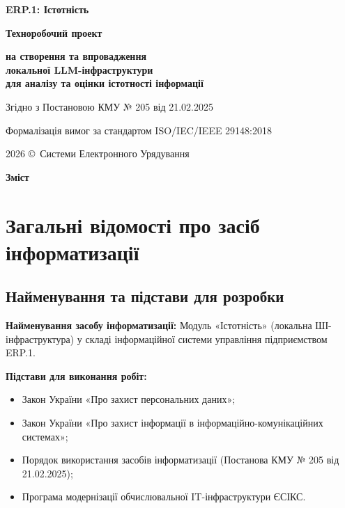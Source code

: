 \documentclass{article}
\newcommand\HUGE[1]{\fontsize{38}{38}\selectfont #1}
\begin{document}
\pagestyle{fancy}

\begin{titlepage}
\AddToShipoutPictureBG*{\AtPageLowerLeft{\color{primary}\rule{\paperwidth}{\paperheight}}}
\color{white}\thispagestyle{empty}\vspace*{3cm}\centering
  {\Huge \textbf{ERP.1: Істотність} \par} \vspace{1.5cm}
  {\HUGE \textbf{Техноробочий проект} \par} \vspace{1.5cm}
  {\LARGE \textbf{на створення та впровадження \\ локальної LLM-інфраструктури \\ для аналізу та оцінки істотності інформації} \par} \vspace{1.5cm}
  {\large Згідно з Постановою КМУ № 205 від 21.02.2025 \par}
  {\large Формалізація вимог за стандартом ISO/IEC/IEEE 29148:2018 \par}
  \vfill
  {\large 2026 \copyright\ Системи Електронного Урядування \par}
\end{titlepage}

\newpage
\begin{center}
  {\Huge\color{primary}\bfseries Зміст\par}
\end{center}
\vspace{40pt}
\tableofcontents

\newpage
\section{Загальні відомості про засіб інформатизації}

\subsection{Найменування та підстави для розробки}
\textbf{Найменування засобу інформатизації:} Модуль «Істотність» (локальна ШІ-інфраструктура) у складі інформаційної системи управління підприємством ERP.1.

\textbf{Підстави для виконання робіт:}
\begin{itemize}
    \item Закон України «Про захист персональних даних»;
    \item Закон України «Про захист інформації в інформаційно-комунікаційних системах»;
    \item Порядок використання засобів інформатизації (Постанова КМУ № 205 від 21.02.2025);
    \item Програма модернізації обчислювальної IT-інфраструктури ЄСІКС.
\end{itemize}
\end{document}
